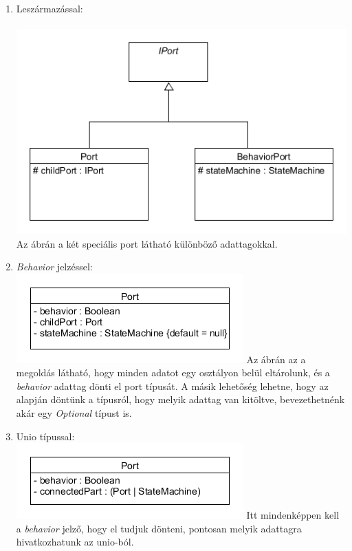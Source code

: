 \documentclass[a4paper,12pt]{report}
\begin{document}
\begin{enumerate}
\item Leszármazással: \\\\
\includegraphics[scale=0.7]{behav_generalport_diag.png} \\
Az ábrán a két speciális port látható különböző adattagokkal.

\item \textit{Behavior} jelzéssel: \\
\includegraphics[scale=0.7]{simple_port_diag.png}
Az ábrán az a megoldás látható, hogy minden adatot egy osztályon belül eltárolunk, és a \textit{behavior} adattag dönti el port típusát. A másik lehetőség lehetne, hogy az alapján döntünk a típusról, hogy melyik adattag van kitöltve, bevezethetnénk akár egy \textit{Optional} típust is. 

\item Unio típussal: \\
\includegraphics[scale=0.7]{unio_port_diag.png}
Itt mindenképpen kell a \textit{behavior} jelző, hogy el tudjuk dönteni, pontosan melyik adattagra hivatkozhatunk az unio-ból. 
\end{enumerate}
\end{document}
